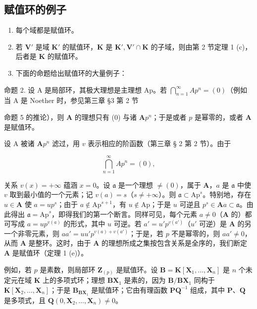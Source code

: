 \subsection{赋值环的例子}

\begin{enumerate}
\def\labelenumi{(\arabic{enumi})}
\item
  每个域都是赋值环。
\item
  若 \(\mathbf{V}'\) 是域 \(\mathbf{K}'\) 的赋值环，\(\mathbf{K}\) 是 \(\mathbf{K}', \mathbf{V}' \cap \mathbf{K}\) 的子域，则由第 2 节定理 1 (c)，后者是 \(\mathbf{K}\) 的赋值环。
\item
  下面的命题给出赋值环的大量例子：
\end{enumerate}

命题 2. 设 A 是局部环，其极大理想是主理想 Ap。若 \(\bigcap_{n=1}^{\infty} A p^n = (0)\)（例如当 A 是 Noether 时，参见第三章 §3 第 2 节

命题 5 的推论），则 \(\mathbf{A}\) 的理想只有 (0) 与诸 \(\mathbf{A}p^n\)；于是或者 \(p\) 是幂零的，或者 \(\mathbf{A}\) 是赋值环。

设 A 被诸 \(\mathbf{A}p^n\) 滤过，用 \(v\) 表示相应的阶函数（第三章 § 2 第 2 节）。由于

\[
\bigcap_ {n = 1} ^ {\infty} A p ^ {n} = (0),
\]

关系 \(v(x) = +\infty\) 蕴涵 \(x = 0\)。设 \(\mathfrak{a}\) 是一个理想 \(\neq (0)\)，属于 \(\mathbf{A}\)，\(a\) 是 \(\mathfrak{a}\) 中使 \(v\) 取到最小值的一个元素；记 \(v(a) = s\)（\(s \neq +\infty\)）。则 \(\mathfrak{a} \subset \mathrm{Ap}^s\)。特别地，存在 \(u \in \mathbf{A}\) 使 \(a = up^s\)；由于 \(a \notin \mathrm{Ap}^{s+1}\)，有 \(u \notin \mathrm{Ap}\)；于是 \(u\) 可逆且 \(p^s \in \mathbf{A}a \subset \mathfrak{a}\)。由此得出 \(\mathfrak{a} = \mathrm{Ap}^s\)，即得我们的第一个断言。同样可见，每个元素 \(a \neq 0\)（\(\mathbf{A}\) 的）都可写成 \(a = up^{v(a)}\) 的形式，其中 \(u\) 可逆。若 \(a' = u'p^{v(a')}\)（\(u'\) 可逆）是 \(\mathbf{A}\) 的另一个非零元素，则 \(aa' = uu'p^{v(a)+v(a')}\)；于是，若 \(p\) 不是幂零的，则 \(aa' \neq 0\)，从而 \(\mathbf{A}\) 是整环。这时，由于 \(\mathbf{A}\) 的理想所成之集按包含关系是全序的，我们断定 \(\mathbf{A}\) 是赋值环（定理 1 (e)）。

例如，若 \(p\) 是素数，则局部环 \(\mathbf{Z}_{(p)}\) 是赋值环。设 \(\mathbf{B} = \mathbf{K}[\mathbf{X}_1, \ldots, \mathbf{X}_n]\) 是 \(n\) 个未定元在域 \(\mathbf{K}\) 上的多项式环；理想 \(\mathbf{BX}_1\) 是素的，因为 \(\mathbf{B} / \mathbf{BX}_1\) 同构于 \(\mathbf{K}[\mathbf{X}_2, \ldots, \mathbf{X}_n]\)；于是 \(\mathbf{B}_{\mathbf{BX}_1}\) 是赋值环；它由有理函数 \(\mathbf{PQ}^{-1}\) 组成，其中 \(\mathbf{P}\)、\(\mathbf{Q}\) 是多项式，且 \(\mathbf{Q}(0, \mathbf{X}_2, \ldots, \mathbf{X}_n) \neq 0\)。


